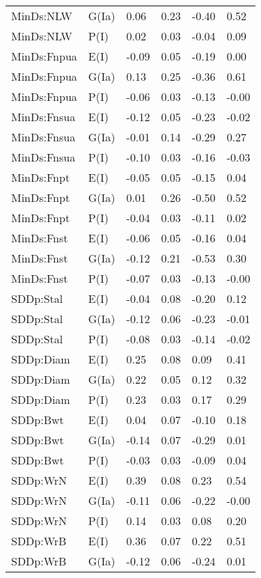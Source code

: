 \begin{center}
\begin{longtable}{|p{1.1in}|p{0.7in}|p{0.7in}|p{0.6in}|p{0.6in}|p{0.6in}|}
  MinDs:NLW & G(Ia) & 0.06 & 0.23 & -0.40 & 0.52 \\ 
  MinDs:NLW & P(I) & 0.02 & 0.03 & -0.04 & 0.09 \\ 
  MinDs:Fnpua & E(I) & -0.09 & 0.05 & -0.19 & 0.00 \\ 
  MinDs:Fnpua & G(Ia) & 0.13 & 0.25 & -0.36 & 0.61 \\ 
  MinDs:Fnpua & P(I) & -0.06 & 0.03 & -0.13 & -0.00 \\ 
  MinDs:Fnsua & E(I) & -0.12 & 0.05 & -0.23 & -0.02 \\ 
  MinDs:Fnsua & G(Ia) & -0.01 & 0.14 & -0.29 & 0.27 \\ 
  MinDs:Fnsua & P(I) & -0.10 & 0.03 & -0.16 & -0.03 \\ 
  MinDs:Fnpt & E(I) & -0.05 & 0.05 & -0.15 & 0.04 \\ 
  MinDs:Fnpt & G(Ia) & 0.01 & 0.26 & -0.50 & 0.52 \\ 
  MinDs:Fnpt & P(I) & -0.04 & 0.03 & -0.11 & 0.02 \\ 
  MinDs:Fnst & E(I) & -0.06 & 0.05 & -0.16 & 0.04 \\ 
  MinDs:Fnst & G(Ia) & -0.12 & 0.21 & -0.53 & 0.30 \\ 
  MinDs:Fnst & P(I) & -0.07 & 0.03 & -0.13 & -0.00 \\ 
  SDDp:Stal & E(I) & -0.04 & 0.08 & -0.20 & 0.12 \\ 
  SDDp:Stal & G(Ia) & -0.12 & 0.06 & -0.23 & -0.01 \\ 
  SDDp:Stal & P(I) & -0.08 & 0.03 & -0.14 & -0.02 \\ 
  SDDp:Diam & E(I) & 0.25 & 0.08 & 0.09 & 0.41 \\ 
  SDDp:Diam & G(Ia) & 0.22 & 0.05 & 0.12 & 0.32 \\ 
  SDDp:Diam & P(I) & 0.23 & 0.03 & 0.17 & 0.29 \\ 
  SDDp:Bwt & E(I) & 0.04 & 0.07 & -0.10 & 0.18 \\ 
  SDDp:Bwt & G(Ia) & -0.14 & 0.07 & -0.29 & 0.01 \\ 
  SDDp:Bwt & P(I) & -0.03 & 0.03 & -0.09 & 0.04 \\ 
  SDDp:WrN & E(I) & 0.39 & 0.08 & 0.23 & 0.54 \\ 
  SDDp:WrN & G(Ia) & -0.11 & 0.06 & -0.22 & -0.00 \\ 
  SDDp:WrN & P(I) & 0.14 & 0.03 & 0.08 & 0.20 \\ 
  SDDp:WrB & E(I) & 0.36 & 0.07 & 0.22 & 0.51 \\ 
  SDDp:WrB & G(Ia) & -0.12 & 0.06 & -0.24 & 0.01 \\ 

\end{longtable}
\end{center}
